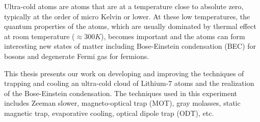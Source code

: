 %
%
%
Ultra-cold atoms are atoms that are at a temperature close to absolute zero, typically at the order of micro Kelvin or lower. At these low temperatures, the quantum properties of the atoms, which are usually dominated by thermal effect at room temperature ($\approx300K$), becomes important and the atoms can form interesting new states of matter including Bose-Einstein condensation (BEC) for bosons and degenerate Fermi gas for fermions.

This thesis presents our work on developing and improving the techniques of trapping and cooling an ultra-cold cloud of Lithium-$7$ atoms and the realization of the Bose-Einstein condensation. The techniques used in this experiment includes Zeeman slower, magneto-optical trap (MOT), gray molasses, static magnetic trap, evaporative cooling, optical dipole trap (ODT), etc.
